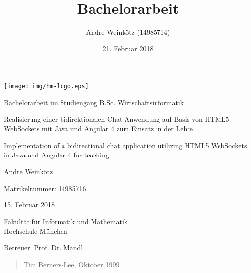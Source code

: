 \documentclass[11pt,a4paper,titlepage]{scrartcl}
\title{Bachelorarbeit}
\author{Andre Weinkötz (14985714)}
\date{21. Februar 2018}
\numberwithin{equation}{section}
\begin{document}
  \pagestyle{empty}
  \renewcommand{\thelstlisting}{\arabic{section}.\arabic{lstlisting}}
\begin{titlepage}

\begin{center}
	\texttt{[image: img/hm-logo.eps]}
\end{center}
 \bigskip

 \begin{center} \large 
    
    Bachelorarbeit im Studiengang B.Sc. Wirtschaftsinformatik
    \vspace*{2cm}
\end{center}
\begin{doublespace}
	{\huge Realisierung einer bidirektionalen Chat-Anwendung auf Basis von HTML5-WebSockets mit Java und Angular 4 zum Einsatz in der Lehre}\\
\vspace{1.5cm}

	{\huge \noindent Implementation of a bidirectional chat application utilizing HTML5 WebSockets in Java and Angular 4 for teaching}
\end{doublespace}

    
    \vspace*{2.0cm}
 \begin{center}
    Andre Weinkötz \bigskip
    
    
    Matrikelnummer: 14985716 \bigskip


    15. Februar 2018
    \vspace*{1.5cm}
    
    

    Fakultät für Informatik und Mathematik \\
	Hochschule München\bigskip
	
	Betreuer: Prof. Dr. Mandl 
	
	
  \end{center}
\end{titlepage}
\newpage
\vspace*{9cm}
\begin{quote}
\medskip
	Tim Berners-Lee, Oktober 1999
\end{quote}
\end{document}
